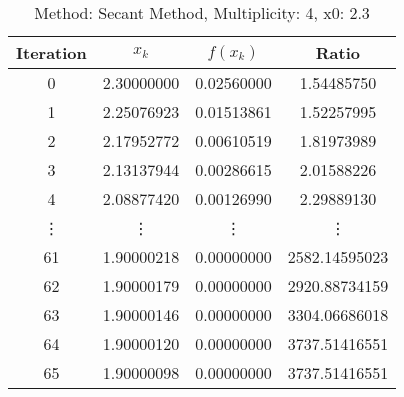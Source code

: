 \begin{table}
\centering
\caption{Method: Secant Method, Multiplicity: 4, x0: 2.3}
\label{tab:table_Secant_Method_4_2_3}
\begin{tabular}{c c c c}
\toprule
Iteration &      $x_k$ &   $f(x_k)$ &         Ratio \\
\midrule
        0 & 2.30000000 & 0.02560000 &    1.54485750 \\
        1 & 2.25076923 & 0.01513861 &    1.52257995 \\
        2 & 2.17952772 & 0.00610519 &    1.81973989 \\
        3 & 2.13137944 & 0.00286615 &    2.01588226 \\
        4 & 2.08877420 & 0.00126990 &    2.29889130 \\
   \vdots &     \vdots &     \vdots &        \vdots \\
       61 & 1.90000218 & 0.00000000 & 2582.14595023 \\
       62 & 1.90000179 & 0.00000000 & 2920.88734159 \\
       63 & 1.90000146 & 0.00000000 & 3304.06686018 \\
       64 & 1.90000120 & 0.00000000 & 3737.51416551 \\
       65 & 1.90000098 & 0.00000000 & 3737.51416551 \\
\bottomrule
\end{tabular}
\end{table}
